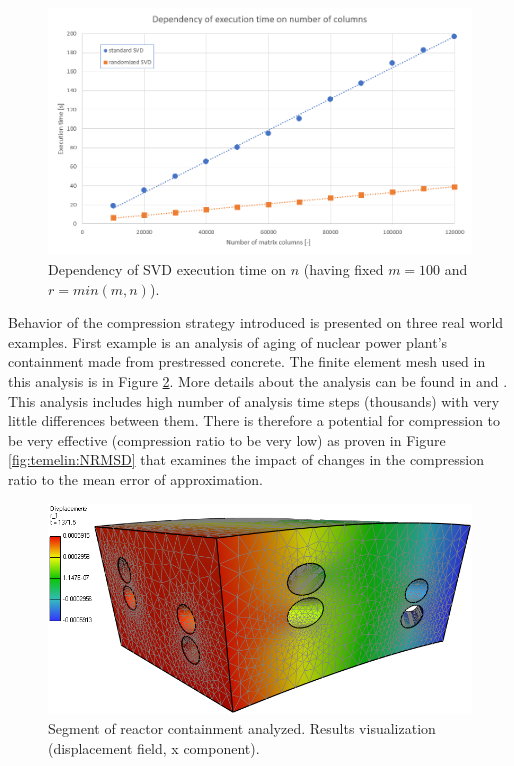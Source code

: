 \begin{figure}[H]
\centering
\includegraphics[width=\textwidth]{figures/chapter-SVD/executionTime_varyingColumns}
\decoRule
\caption[Dependency of SVD execution time on number of columns.]{Dependency of SVD execution time on $n$ (having fixed $m = 100$ and $r=min(m,n)$).}
\label{fig:ExeTime_columns}
\end{figure}

Behavior of the compression strategy introduced is presented on three real world examples. First example is an analysis of aging of nuclear power plant's containment made from prestressed concrete. The finite element mesh used in this analysis is in Figure \ref{fig:temelin:mesh}. More details about the analysis can be found in \cite{Kruis2012} and \cite{Koudelka2009}. This analysis includes high number of analysis time steps (thousands) with very little differences between them. There is therefore a potential for compression to be very effective (compression ratio to be very low) as proven in Figure \ref{fig:temelin:NRMSD} that examines the impact of changes in the compression ratio to the mean error of approximation.

\begin{figure}[H]
\centering
\includegraphics[width=\textwidth]{figures/chapter-SVD/temelin_screenshot}
\decoRule
\caption[Results visualization: reactor containment 3D.]{Segment of reactor containment analyzed. Results visualization (displacement field, x component).}
\label{fig:temelin:mesh}
\end{figure}

